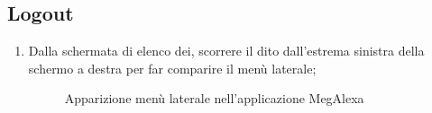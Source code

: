 \subsection{Logout}
\begin{enumerate}
	\item Dalla schermata di elenco dei, scorrere il dito dall'estrema sinistra della schermo a destra per far comparire il menù laterale;
	\begin{figure}[H]
		\centering
		\caption{Apparizione menù laterale nell'applicazione MegAlexa}
	\end{figure}


\end{enumerate}
